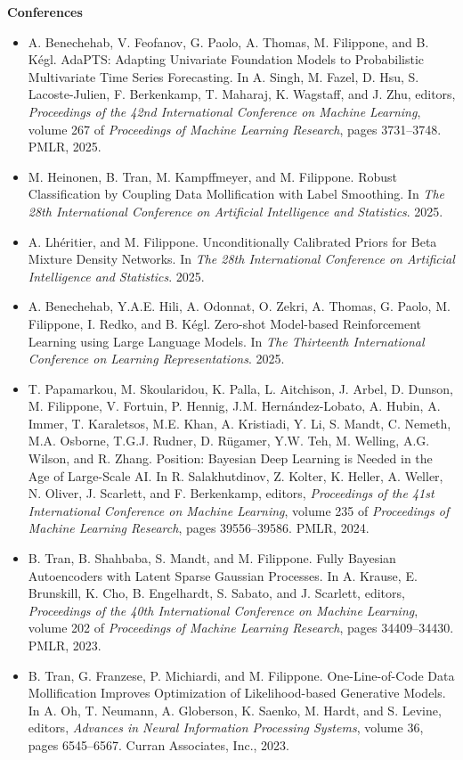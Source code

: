 \textbf{Conferences}\begin{itemize}
\item  A. Benechehab, V. Feofanov, G. Paolo, A. Thomas, M. Filippone, and B. K\'{e}gl. {A}da{PTS}: {Adapting Univariate Foundation Models to Probabilistic Multivariate Time Series Forecasting}. In A. Singh, M. Fazel, D. Hsu, S. Lacoste-Julien, F. Berkenkamp, T. Maharaj, K. Wagstaff, and J. Zhu, editors, \emph{Proceedings of the 42nd International Conference on Machine Learning}, volume 267 of \emph{Proceedings of Machine Learning Research}, pages 3731--3748. PMLR, 2025.
\item  M. Heinonen, B. Tran, M. Kampffmeyer, and M. Filippone. {Robust Classification by Coupling Data Mollification with Label Smoothing}. In \emph{The 28th International Conference on Artificial Intelligence and Statistics}. 2025.
\item  A. Lh{\'e}ritier, and M. Filippone. {Unconditionally Calibrated Priors for Beta Mixture Density Networks}. In \emph{The 28th International Conference on Artificial Intelligence and Statistics}. 2025.
\item  A. Benechehab, Y.A.E. Hili, A. Odonnat, O. Zekri, A. Thomas, G. Paolo, M. Filippone, I. Redko, and B. K{\'e}gl. {Zero-shot Model-based Reinforcement Learning using Large Language Models}. In \emph{The Thirteenth International Conference on Learning Representations}. 2025.
\item  T. Papamarkou, M. Skoularidou, K. Palla, L. Aitchison, J. Arbel, D. Dunson, M. Filippone, V. Fortuin, P. Hennig, J.M. Hern\'{a}ndez-Lobato, A. Hubin, A. Immer, T. Karaletsos, M.E. Khan, A. Kristiadi, Y. Li, S. Mandt, C. Nemeth, M.A. Osborne, T.G.J. Rudner, D. R\"{u}gamer, Y.W. Teh, M. Welling, A.G. Wilson, and R. Zhang. Position: {B}ayesian Deep Learning is Needed in the Age of Large-Scale {AI}. In R. Salakhutdinov, Z. Kolter, K. Heller, A. Weller, N. Oliver, J. Scarlett, and F. Berkenkamp, editors, \emph{Proceedings of the 41st International Conference on Machine Learning}, volume 235 of \emph{Proceedings of Machine Learning Research}, pages 39556--39586. PMLR, 2024.
\item  B. Tran, B. Shahbaba, S. Mandt, and M. Filippone. Fully {B}ayesian Autoencoders with Latent Sparse {G}aussian Processes. In A. Krause, E. Brunskill, K. Cho, B. Engelhardt, S. Sabato, and J. Scarlett, editors, \emph{Proceedings of the 40th International Conference on Machine Learning}, volume 202 of \emph{Proceedings of Machine Learning Research}, pages 34409--34430. PMLR, 2023.
\item  B. Tran, G. Franzese, P. Michiardi, and M. Filippone. One-Line-of-Code Data Mollification Improves Optimization of Likelihood-based Generative Models. In A. Oh, T. Neumann, A. Globerson, K. Saenko, M. Hardt, and S. Levine, editors, \emph{Advances in Neural Information Processing Systems}, volume 36, pages 6545--6567. Curran Associates, Inc., 2023.

\end{itemize}
